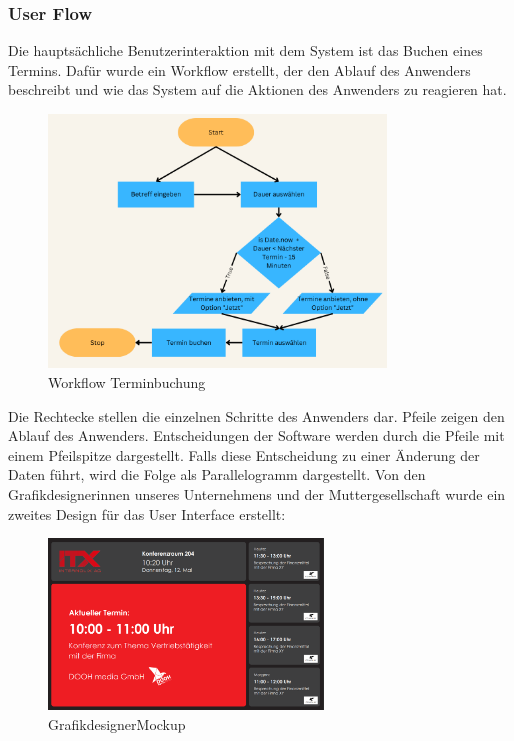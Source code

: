 \subsubsection{User Flow}\label{subsubsec:user-flow}
Die hauptsächliche Benutzerinteraktion mit dem System ist das Buchen eines Termins.
Dafür wurde ein Workflow erstellt, der den Ablauf des Anwenders beschreibt und wie das System auf die Aktionen des Anwenders zu reagieren hat.
\begin{figure}[h]
\par\vspace{1cm}
\centering
\includegraphics[width=0.8\textwidth]{Bilder/Workflow Terminbuchung}
\caption{Workflow Terminbuchung}
\label{fig:Workflow Terminbuchung}
\par\vspace{1cm}
\end{figure}
\justifying
\newline
Die Rechtecke stellen die einzelnen Schritte des Anwenders dar.
Pfeile zeigen den Ablauf des Anwenders.
Entscheidungen der Software werden durch die Pfeile mit einem Pfeilspitze dargestellt.
Falls diese Entscheidung zu einer Änderung der Daten führt, wird die Folge als Parallelogramm dargestellt.
\newline
\newline
Von den Grafikdesignerinnen unseres Unternehmens und der Muttergesellschaft wurde ein zweites Design für das User Interface erstellt:

\newline
\begin{figure}[hbt!]
\par\vspace{1cm}
\centering
\includegraphics[width=0.65\textwidth]{Bilder/GrafikdesignerMockup}
\caption{GrafikdesignerMockup}
\label{fig:GrafikdesignerMockup}
\par\vspace{1cm}
\end{figure}
\justifying


